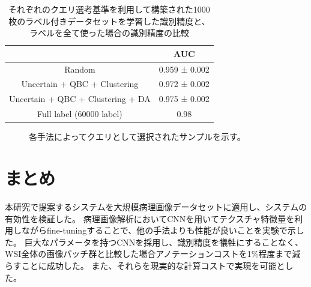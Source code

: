 \begin{table}[h]
  \caption{\label{table:camelyon_last_accuracy}それぞれのクエリ選考基準を利用して構築された1000枚のラベル付きデータセットを学習した識別精度と、ラベルを全て使った場合の識別精度の比較}
  \center
  \begin{tabular}{c|c} 
       &  AUC \\ \hline
      Random & 0.959 ± 0.002  \\
      Uncertain + QBC + Clustering & 0.972 ± 0.002  \\ 
      Uncertain + QBC + Clustering + DA & 0.975 ± 0.002  \\ \hline
      Full label (60000 label) & 0.98
  \end{tabular}
\end{table}

\begin{figure}[hbp]
  \begin{center}

  \caption{\label{figure:camelyon_query_examples}各手法によってクエリとして選択されたサンプルを示す。}
  \end{center}
\end{figure}


\section{まとめ}
本研究で提案するシステムを大規模病理画像データセットに適用し、システムの有効性を検証した。
病理画像解析においてCNNを用いてテクスチャ特徴量を利用しながらfine-tuningすることで、他の手法よりも性能が良いことを実験で示した。
巨大なパラメータを持つCNNを採用し、識別精度を犠牲にすることなく、WSI全体の画像パッチ群と比較した場合アノテーションコストを1$\%$程度まで減らすことに成功した。
また、それらを現実的な計算コストで実現を可能とした。